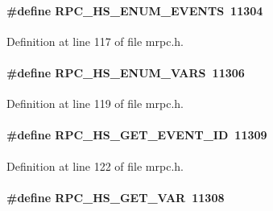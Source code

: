 \paragraph[{RPC\_\-HS\_\-ENUM\_\-EVENTS}]{\setlength{\rightskip}{0pt plus 5cm}\#define RPC\_\-HS\_\-ENUM\_\-EVENTS~11304}\hfill\label{group__mrpcdefineh_gac43c0f6b242f855a6e30335913ef2de9}

\begin{DoxyItemize}
\item 
\end{DoxyItemize}

Definition at line 117 of file mrpc.h.
\paragraph[{RPC\_\-HS\_\-ENUM\_\-VARS}]{\setlength{\rightskip}{0pt plus 5cm}\#define RPC\_\-HS\_\-ENUM\_\-VARS~11306}\hfill\label{group__mrpcdefineh_ga03b69c70087647cbea450ba968bcec9b}

\begin{DoxyItemize}
\item 
\end{DoxyItemize}

Definition at line 119 of file mrpc.h.
\paragraph[{RPC\_\-HS\_\-GET\_\-EVENT\_\-ID}]{\setlength{\rightskip}{0pt plus 5cm}\#define RPC\_\-HS\_\-GET\_\-EVENT\_\-ID~11309}\hfill\label{group__mrpcdefineh_ga4f8ad9ec49e28393516bd2c909463c6c}

\begin{DoxyItemize}
\item 
\end{DoxyItemize}

Definition at line 122 of file mrpc.h.
\paragraph[{RPC\_\-HS\_\-GET\_\-VAR}]{\setlength{\rightskip}{0pt plus 5cm}\#define RPC\_\-HS\_\-GET\_\-VAR~11308}\hfill\label{group__mrpcdefineh_ga80424615873f6deec4b651d65133a241}

